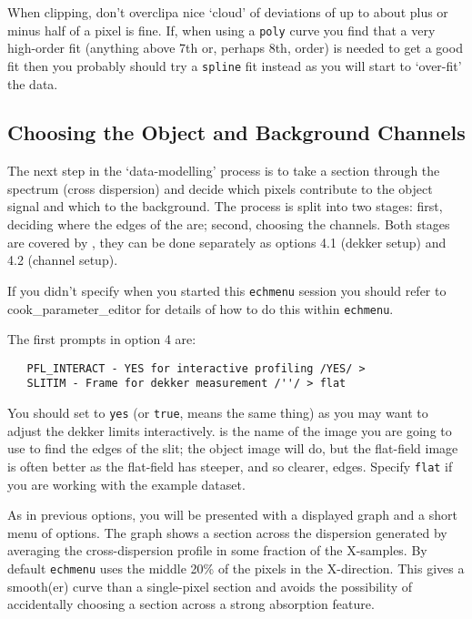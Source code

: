 When clipping, don't overclip\scspec{---}{ - }a nice `cloud' of deviations
of up to about plus or minus half of a pixel is fine.  If, when using a
\verb+poly+ curve you find that a very high-order fit (anything above 7th or,
perhaps 8th, order) is needed to get a good fit then you probably should
try a \verb+spline+ fit instead as you will start to `over-fit' the data.


\subsection{Choosing the Object and Background Channels}

The next step in the `data-modelling' process is to take a section through
the spectrum (cross dispersion) and decide which pixels contribute to the
object signal and which to the background.  The process is split into two
stages: first, deciding where the edges of the 
are; second, choosing the channels.  Both stages are covered by
,
they can be done separately as options 4.1 (dekker setup) and 4.2
(channel setup).

If you didn't specify  when you started this
\verb+echmenu+ session you should refer to
\scspec{\S\ref{cook_parameter_editor}}
{
{cook_parameter_editor}} for details of how to do this within
\verb+echmenu+\@.

The first prompts in option 4 are:

{
\scspec{\small}{ }
\begin{verbatim}
   PFL_INTERACT - YES for interactive profiling /YES/ >
   SLITIM - Frame for dekker measurement /''/ > flat
\end{verbatim}
}

You should set
 to \verb+yes+
(or \verb+true+, means the same thing) as you may want to adjust the
dekker limits interactively.
 is the name of the image you
are going to use to find the edges of the slit; the object image will
do, but the flat-field image is often better as the flat-field has
steeper, and so clearer, edges.
Specify \verb+flat+ if you are working with the example dataset.

As in previous options, you will be presented with a displayed graph and a
short menu of options.  The graph shows a section across the dispersion
generated by averaging the cross-dispersion profile in some fraction
of the X-samples.  By default \verb+echmenu+ uses the middle 20\% of the
pixels in the X-direction.
This gives a smooth(er) curve than a single-pixel section
and avoids the possibility of accidentally choosing a section across a
strong absorption feature.

